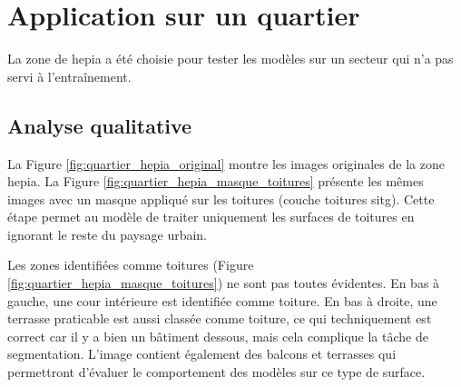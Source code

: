 \section{Application sur un quartier}
La zone de \acrshort{hepia} a été choisie pour tester les modèles sur un secteur qui n'a pas servi à l'entraînement.

\subsection{Analyse qualitative}
La Figure \ref{fig:quartier_hepia_original} montre les images originales de la zone \acrshort{hepia}. La Figure \ref{fig:quartier_hepia_masque_toitures} présente les mêmes images avec un masque appliqué sur les toitures (couche toitures \acrshort{sitg}). Cette étape permet au modèle de traiter uniquement les surfaces de toitures en ignorant le reste du paysage urbain.

Les zones identifiées comme toitures (Figure \ref{fig:quartier_hepia_masque_toitures}) ne sont pas toutes évidentes. En bas à gauche, une cour intérieure est identifiée comme toiture. En bas à droite, une terrasse praticable est aussi classée comme toiture, ce qui techniquement est correct car il y a bien un bâtiment dessous, mais cela complique la tâche de segmentation. L'image contient également des balcons et terrasses qui permettront d'évaluer le comportement des modèles sur ce type de surface.

